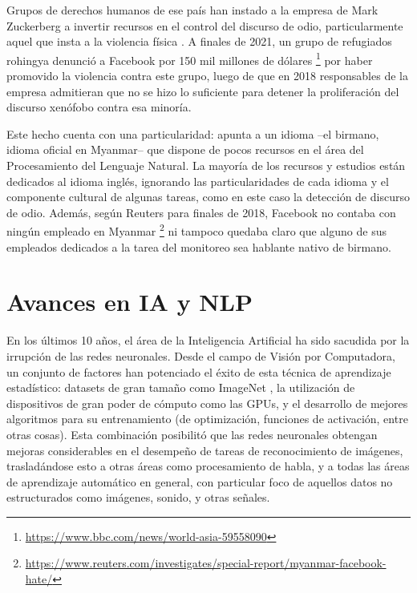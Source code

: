 Grupos de derechos humanos de ese país han instado a la empresa de Mark Zuckerberg a invertir recursos en el control del discurso de odio, particularmente aquel que insta a la violencia física \cite{irrawaddy2018zuckerberg}. A finales de 2021, un grupo de refugiados rohingya denunció a Facebook por 150 mil millones de dólares \footnote{\url{https://www.bbc.com/news/world-asia-59558090}} por haber promovido la violencia contra este grupo, luego de que en 2018 responsables de la empresa admitieran que no se hizo lo suficiente para detener la proliferación del discurso xenófobo contra esa minoría.

Este hecho cuenta con una particularidad: apunta a un idioma --el birmano, idioma oficial en Myanmar-- que dispone de pocos recursos en el área del Procesamiento del Lenguaje Natural. La mayoría de los recursos y estudios están dedicados al idioma inglés, ignorando las particularidades de cada idioma y el componente cultural de algunas tareas, como en este caso la detección de discurso de odio. Además, según Reuters para finales de 2018, Facebook no contaba con ningún empleado en Myanmar \footnote{\url{https://www.reuters.com/investigates/special-report/myanmar-facebook-hate/}} ni tampoco quedaba claro que alguno de sus empleados dedicados a la tarea del monitoreo sea hablante nativo de birmano.


\section{Avances en IA y NLP}

En los últimos 10 años, el área de la Inteligencia Artificial ha sido sacudida por la irrupción de las redes neuronales. Desde el campo de Visión por Computadora, un conjunto de factores han potenciado el éxito de esta técnica de aprendizaje estadístico: datasets de gran tamaño como ImageNet \cite{imagenet2009deng}, la utilización de dispositivos de gran poder de cómputo como las GPUs, y el desarrollo de mejores algoritmos para su entrenamiento (de optimización, funciones de activación, entre otras cosas). Esta combinación posibilitó que las redes neuronales obtengan mejoras considerables en el desempeño de tareas de reconocimiento de imágenes, trasladándose esto a otras áreas como procesamiento de habla, y a todas las áreas de aprendizaje automático en general, con particular foco de aquellos datos no estructurados como imágenes, sonido, y otras señales.

